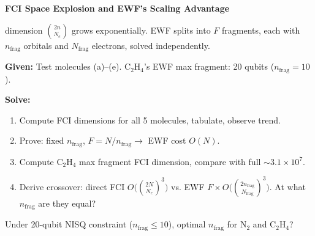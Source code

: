 \documentclass{ctexart}
\begin{document}
 \textbf{FCI Space Explosion and EWF's Scaling Advantage}

 dimension $\binom{2n}{N_e}$ grows exponentially. EWF splits into $F$ fragments, each with $n_{\text{frag}}$ orbitals and $N_{\text{frag}}$ electrons, solved independently.

\noindent\textbf{Given:} Test molecules (a)–(e). C$_{2}$H$_{4}$'s EWF max fragment: 20 qubits ($n_{\text{frag}}=10$).

\noindent\textbf{Solve:} \begin{enumerate}

\item[(a)] Compute FCI dimensions for all 5 molecules, tabulate, observe trend.

\item[(b)] Prove: fixed $n_{\text{frag}}$, $F = N/n_{\text{frag}} \rightarrow$ EWF cost $O(N)$.

\item[(c)] Compute C$_{2}$H$_{4}$ max fragment FCI dimension, compare with full $\sim 3.1 \times 10^7$.

\item[(d)] Derive crossover: direct FCI $O\bigl(\binom{2N}{N_e}^3\bigr)$ vs. EWF $F \times O\bigl(\binom{2n_{\text{frag}}}{N_{\text{frag}}}^3\bigr)$. At what $n_{\text{frag}}$ are they equal?

\end{enumerate}

 Under 20-qubit NISQ constraint ($n_{\text{frag}} \leq 10$), optimal $n_{\text{frag}}$ for N$_2$ and C$_2$H$_4$?
\end{document}
